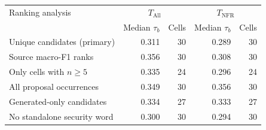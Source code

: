 \begin{tabular}{lrrrr}
\toprule
Ranking analysis & \multicolumn{2}{c}{$T_{\mathrm{All}}$} & \multicolumn{2}{c}{$T_{\mathrm{NFR}}$} \\
 & Median $\tau_b$ & Cells & Median $\tau_b$ & Cells \\
\midrule
Unique candidates (primary) & 0.311 & 30 & 0.289 & 30 \\
Source macro-F1 ranks & 0.356 & 30 & 0.308 & 30 \\
Only cells with $n\geq5$ & 0.335 & 24 & 0.296 & 24 \\
All proposal occurrences & 0.349 & 30 & 0.356 & 30 \\
Generated-only candidates & 0.334 & 27 & 0.333 & 27 \\
No standalone security word & 0.300 & 30 & 0.294 & 30 \\
\bottomrule
\end{tabular}
